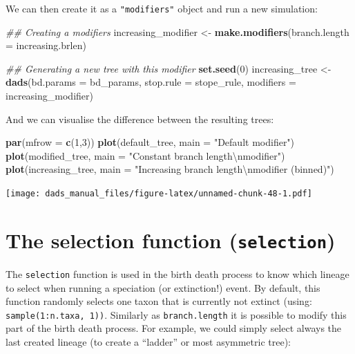 \documentclass[]{book}
\newenvironment{Shaded}{\begin{snugshade}}{\end{snugshade}}
\newcommand{\CharTok}[1]{\textcolor[rgb]{0.31,0.60,0.02}{#1}}
\newcommand{\CommentTok}[1]{\textcolor[rgb]{0.56,0.35,0.01}{\textit{#1}}}
\newcommand{\DataTypeTok}[1]{\textcolor[rgb]{0.13,0.29,0.53}{#1}}
\newcommand{\DecValTok}[1]{\textcolor[rgb]{0.00,0.00,0.81}{#1}}
\newcommand{\KeywordTok}[1]{\textcolor[rgb]{0.13,0.29,0.53}{\textbf{#1}}}
\newcommand{\NormalTok}[1]{#1}
\newcommand{\StringTok}[1]{\textcolor[rgb]{0.31,0.60,0.02}{#1}}
\begin{document}
We can then create it as a \texttt{"modifiers"} object and run a new simulation:

\begin{Shaded}
\begin{Highlighting}[]
\CommentTok{## Creating a modifiers}
\NormalTok{increasing_modifier <-}\StringTok{ }\KeywordTok{make.modifiers}\NormalTok{(}\DataTypeTok{branch.length =}\NormalTok{ increasing.brlen)}

\CommentTok{## Generating a new tree with this modifier}
\KeywordTok{set.seed}\NormalTok{(}\DecValTok{0}\NormalTok{)}
\NormalTok{increasing_tree <-}\StringTok{ }\KeywordTok{dads}\NormalTok{(}\DataTypeTok{bd.params =}\NormalTok{ bd_params,}
                        \DataTypeTok{stop.rule =}\NormalTok{ stope_rule,}
                        \DataTypeTok{modifiers =}\NormalTok{ increasing_modifier)}
\end{Highlighting}
\end{Shaded}

And we can visualise the difference between the resulting trees:

\begin{Shaded}
\begin{Highlighting}[]
\KeywordTok{par}\NormalTok{(}\DataTypeTok{mfrow =} \KeywordTok{c}\NormalTok{(}\DecValTok{1}\NormalTok{,}\DecValTok{3}\NormalTok{))}
\KeywordTok{plot}\NormalTok{(default_tree,    }\DataTypeTok{main =} \StringTok{"Default modifier"}\NormalTok{)}
\KeywordTok{plot}\NormalTok{(modified_tree,   }\DataTypeTok{main =} \StringTok{"Constant branch length}\CharTok{\textbackslash{}n}\StringTok{modifier"}\NormalTok{)}
\KeywordTok{plot}\NormalTok{(increasing_tree, }\DataTypeTok{main =} \StringTok{"Increasing branch length}\CharTok{\textbackslash{}n}\StringTok{modifier (binned)"}\NormalTok{)}
\end{Highlighting}
\end{Shaded}

\texttt{[image: dads\_manual\_files/figure-latex/unnamed-chunk-48-1.pdf]}

\hypertarget{the-selection-function-selection}{%
\section{\texorpdfstring{The selection function (\texttt{selection})}{The selection function (selection)}}\label{the-selection-function-selection}}

The \texttt{selection} function is used in the birth death process to know which lineage to select when running a speciation (or extinction!) event.
By default, this function randomly selects one taxon that is currently not extinct (using: \texttt{sample(1:n.taxa,\ 1))}.
Similarly as \texttt{branch.length} it is possible to modify this part of the birth death process.
For example, we could simply select always the last created lineage (to create a ``ladder'' or most asymmetric tree):
\end{document}
